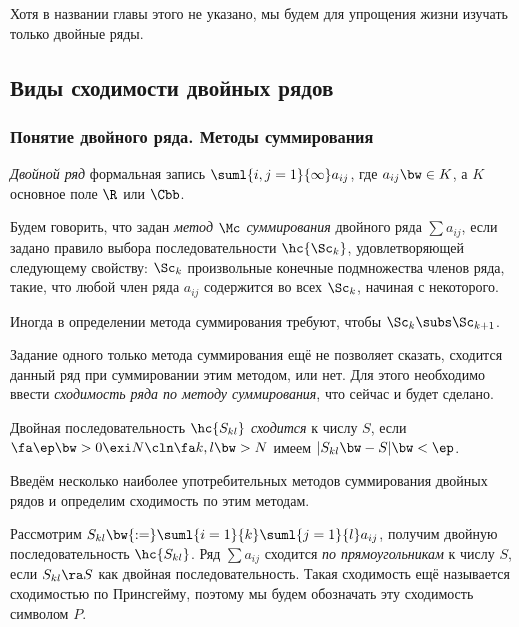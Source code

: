 \documentclass[a4paper]{article}
\begin{document}
Хотя в названии главы этого не указано, мы будем для упрощения жизни изучать только двойные ряды.

\subsection{Виды сходимости двойных рядов}

\subsubsection{Понятие двойного ряда. Методы суммирования}

\begin{df}
\emph{Двойной ряд} формальная запись $\suml{i,j=1}{\infty}a_{ij}$, где $a_{ij} \bw\in K$, а $K$
основное поле $\R$ или $\Cbb$.
\end{df}
\begin{df}
Будем говорить, что задан \emph{метод $\Mc$ суммирования} двойного ряда $\sum a_{ij}$, если задано
правило выбора последовательности $\hc{\Sc_k}$, удовлетворяющей следующему свойству: $\Sc_k$
произвольные конечные подмножества членов ряда, такие, что любой член ряда $a_{ij}$
содержится во всех $\Sc_k$, начиная с некоторого.
\end{df}

\begin{note}
Иногда в определении метода суммирования требуют, чтобы $\Sc_k \subs \Sc_{k+1}$.
\end{note}

\begin{note}
Задание одного только метода суммирования ещё не позволяет сказать, сходится данный ряд при
суммировании этим методом, или нет. Для этого необходимо ввести \emph{сходимость ряда по
методу суммирования}, что сейчас и будет сделано.
\end{note}

\begin{df}
Двойная последовательность $\hc{S_{kl}}$ \emph{сходится} к числу $S$, если
$\fa \ep \bw> 0 \exi N\cln \fa k, l \bw> N$ имеем $|S_{kl} \bw- S| \bw< \ep$.
\end{df}

Введём несколько наиболее употребительных методов суммирования двойных рядов и определим
сходимость по этим методам.

\begin{df}
Рассмотрим $S_{kl} \bw{:=} \suml{i=1}{k}\suml{j=1}{l} a_{ij}$, получим двойную последовательность $\hc{S_{kl}}$.
Ряд $\sum a_{ij}$ сходится \emph{по прямоугольникам} к числу $S$, если $S_{kl} \ra S$ как двойная последовательность.
Такая сходимость ещё называется сходимостью по Принсгейму, поэтому мы будем обозначать эту сходимость символом $P$.
\end{df}
\end{document}
